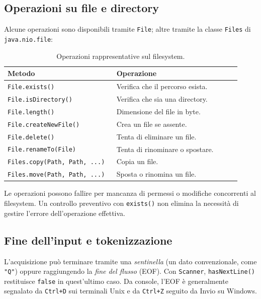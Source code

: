 \subsection{Operazioni su file e directory}
\label{sec:fi-java-file-operazioni-avanzate}

Alcune operazioni sono disponibili tramite \texttt{File}; altre
tramite la classe \texttt{Files} di \texttt{java.nio.file}:

\begin{table}[htbp]
  \centering
  \small
  \begin{tabular}{@{}p{0.43\linewidth}p{0.49\linewidth}@{}}
    \toprule
    Metodo & Operazione \\
    \midrule
    \texttt{File.exists()} & Verifica che il percorso esista. \\
    \texttt{File.isDirectory()} & Verifica che sia una directory. \\
    \texttt{File.length()} & Dimensione del file in byte. \\
    \texttt{File.createNewFile()} & Crea un file se assente. \\
    \texttt{File.delete()} & Tenta di eliminare un file. \\
    \texttt{File.renameTo(File)} & Tenta di rinominare o spostare. \\
    \texttt{Files.copy(Path, Path, ...)} & Copia un file. \\
    \texttt{Files.move(Path, Path, ...)} & Sposta o rinomina un file. \\
    \bottomrule
  \end{tabular}
  \caption{Operazioni rappresentative sul filesystem.}
  \label{tab:fi-java-file-operazioni}
\end{table}

Le operazioni possono fallire per mancanza di permessi o
modifiche concorrenti al filesystem. Un controllo preventivo
con \texttt{exists()} non elimina la necessità di gestire
l'errore dell'operazione effettiva.

\subsection{Fine dell'input e tokenizzazione}
\label{sec:fi-java-file-eof-token}

L'acquisizione può terminare tramite una \emph{sentinella}
(un dato convenzionale, come \texttt{"Q"}) oppure raggiungendo
la \emph{fine del flusso} (EOF). Con \texttt{Scanner},
\texttt{hasNextLine()} restituisce \texttt{false} in quest'ultimo
caso. Da console, l'EOF è generalmente segnalato da
\texttt{Ctrl+D} sui terminali Unix e da \texttt{Ctrl+Z} seguito
da Invio su Windows.

